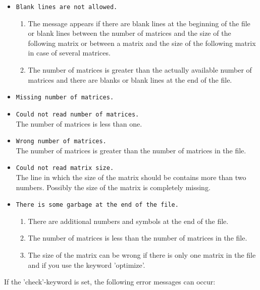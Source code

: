 \begin{itemize}
  \item \texttt{Blank lines are not allowed.}
        \begin{enumerate}
          \item The message appears if there are blank lines at the
                beginning of the file or blank lines between the
                number of matrices and the size of the following
                matrix or between a matrix and the size of the
                following matrix in case of several matrices.
          \item The number of matrices is greater than the actually
                available number of matrices and there are blanks or
                blank lines at the end of the file.
        \end{enumerate}
  \item \texttt{Missing number of matrices.}
  \item \texttt{Could not read number of matrices.} \\
        The number of matrices is less than one.
  \item \texttt{Wrong number of matrices.} \\
        The number of matrices is greater than the number of matrices
        in the file.
  \item \texttt{Could not read matrix size.} \\
        The line in which the size of the matrix should be contains
        more than two numbers. Possibly the size of the matrix is
        completely missing.
  \item \texttt{There is some garbage at the end of the file.}
        \begin{enumerate}
          \item There are additional numbers and symbols at the end of
                the file.
          \item The number of matrices is less than the number of
                matrices in the file.
          \item The size of the matrix can be wrong if there is only
                one matrix in the file and if you use the keyword
                'optimize'.
        \end{enumerate}
\end{itemize}
If the 'check'-keyword is set, the following error messages can occur:
